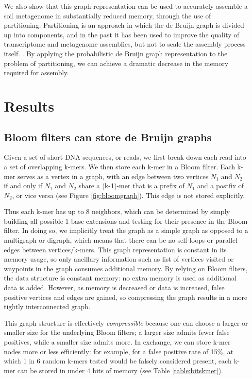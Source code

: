 \documentclass{pnastwo}
\begin{document}
\begin{article}
We also show that this graph representation can be used to accurately
assemble a soil metagenome in substantially reduced memory, through
the use of partitioning.  Partitioning is an approach in which the de
Bruijn graph is divided up into components, and in the past it has
been used to improve the quality of transcriptome and metagenome assemblies,
but not to scale the assembly process itself.
\cite{trinity, metavelvet,pubmed21685107}.  By applying the
probabilistic de Bruijn graph representation to the problem of
partitioning, we can achieve a dramatic decrease in the memory
required for assembly.


\section{Results}

\subsection{Bloom filters can store de Bruijn graphs}

Given a set of short DNA sequences, or reads, we first break down each
read into a set of overlapping k-mers.  We then store each k-mer
in a Bloom filter.  Each k-mer serves as a vertex in a graph, with an edge
between two vertices $N_1$ and $N_2$ if and only if $N_1$ and $N_2$
share a (k-1)-mer that is a prefix of $N_1$ and a postfix of $N_2$,
or vice versa (see Figure \ref{fig:bloomgraph}).  This edge is not stored explicitly.

Thus each k-mer has up to 8 neighbors, which can be determined by
simply building all possible 1-base extensions and testing for their
presence in the Bloom filter.  In doing so, we implicitly treat
the graph as a simple graph as opposed to a multigraph or digraph,
which means that there can be no self-loops or parallel edges between
vertices/k-mers. This graph representation is constant in its memory
usage, so only ancillary information such as list of vertices visited
or waypoints in the graph consumes additional memory.
By relying on Bloom filters, the data structure is constant
memory: no extra memory is used as additional data is added. However,
as memory is decreased or data is increased, false positive vertices
and edges are gained, so compressing the graph results in a more
tightly interconnected graph.

This graph structure is effectively {\em compressible} because one can
choose a larger or smaller size for the underlying Bloom filters; a
larger size admits fewer false positives, while a smaller size admits
more. In exchange, we can store k-mer nodes more or less efficiently: for
example, for a false positive rate of 15\%, at which 1 in 6 random k-mers
tested would be falsely considered present, each k-mer can be stored
in under 4 bits of memory (see Table \ref{table:bitskmer}).


\end{article}
\end{document}
